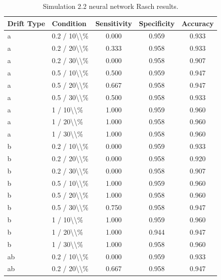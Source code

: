 \begin{table}[!h]
\centering
\caption{\label{tab:tab:sim22_nn_rasch}Simulation 2.2 neural network Rasch results.}
\centering
\begin{tabular}[t]{llccc}
\toprule
Drift Type & Condition & Sensitivity & Specificity & Accuracy\\
\midrule
a & 0.2 / 10\textbackslash{}\textbackslash{}\% & 0.000 & 0.959 & 0.933\\
a & 0.2 / 20\textbackslash{}\textbackslash{}\% & 0.333 & 0.958 & 0.933\\
a & 0.2 / 30\textbackslash{}\textbackslash{}\% & 0.000 & 0.958 & 0.907\\
a & 0.5 / 10\textbackslash{}\textbackslash{}\% & 0.500 & 0.959 & 0.947\\
a & 0.5 / 20\textbackslash{}\textbackslash{}\% & 0.667 & 0.958 & 0.947\\
\addlinespace
a & 0.5 / 30\textbackslash{}\textbackslash{}\% & 0.500 & 0.958 & 0.933\\
a & 1 / 10\textbackslash{}\textbackslash{}\% & 1.000 & 0.959 & 0.960\\
a & 1 / 20\textbackslash{}\textbackslash{}\% & 1.000 & 0.958 & 0.960\\
a & 1 / 30\textbackslash{}\textbackslash{}\% & 1.000 & 0.958 & 0.960\\
b & 0.2 / 10\textbackslash{}\textbackslash{}\% & 0.000 & 0.959 & 0.933\\
\addlinespace
b & 0.2 / 20\textbackslash{}\textbackslash{}\% & 0.000 & 0.958 & 0.920\\
b & 0.2 / 30\textbackslash{}\textbackslash{}\% & 0.000 & 0.958 & 0.907\\
b & 0.5 / 10\textbackslash{}\textbackslash{}\% & 1.000 & 0.959 & 0.960\\
b & 0.5 / 20\textbackslash{}\textbackslash{}\% & 1.000 & 0.958 & 0.960\\
b & 0.5 / 30\textbackslash{}\textbackslash{}\% & 0.750 & 0.958 & 0.947\\
\addlinespace
b & 1 / 10\textbackslash{}\textbackslash{}\% & 1.000 & 0.959 & 0.960\\
b & 1 / 20\textbackslash{}\textbackslash{}\% & 1.000 & 0.944 & 0.947\\
b & 1 / 30\textbackslash{}\textbackslash{}\% & 1.000 & 0.958 & 0.960\\
ab & 0.2 / 10\textbackslash{}\textbackslash{}\% & 0.000 & 0.959 & 0.933\\
ab & 0.2 / 20\textbackslash{}\textbackslash{}\% & 0.667 & 0.958 & 0.947\\

\end{tabular}
\end{table}
